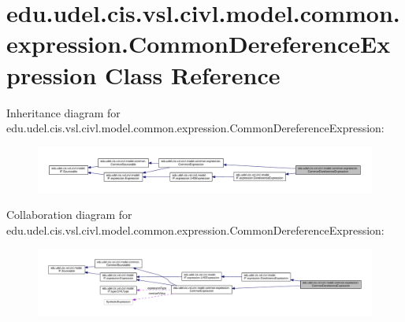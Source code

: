 \hypertarget{classedu_1_1udel_1_1cis_1_1vsl_1_1civl_1_1model_1_1common_1_1expression_1_1CommonDereferenceExpression}{}\section{edu.\+udel.\+cis.\+vsl.\+civl.\+model.\+common.\+expression.\+Common\+Dereference\+Expression Class Reference}
\label{classedu_1_1udel_1_1cis_1_1vsl_1_1civl_1_1model_1_1common_1_1expression_1_1CommonDereferenceExpression}


Inheritance diagram for edu.\+udel.\+cis.\+vsl.\+civl.\+model.\+common.\+expression.\+Common\+Dereference\+Expression\+:
\nopagebreak
\begin{figure}[H]
\begin{center}
\leavevmode
\includegraphics[width=350pt]{classedu_1_1udel_1_1cis_1_1vsl_1_1civl_1_1model_1_1common_1_1expression_1_1CommonDereferenceExpression__inherit__graph}
\end{center}
\end{figure}


Collaboration diagram for edu.\+udel.\+cis.\+vsl.\+civl.\+model.\+common.\+expression.\+Common\+Dereference\+Expression\+:
\nopagebreak
\begin{figure}[H]
\begin{center}
\leavevmode
\includegraphics[width=350pt]{classedu_1_1udel_1_1cis_1_1vsl_1_1civl_1_1model_1_1common_1_1expression_1_1CommonDereferenceExpression__coll__graph}
\end{center}
\end{figure}
